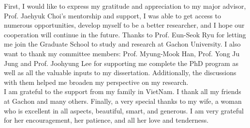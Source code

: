
\begin{acknowledgements}       
First, I would like to express my gratitude and appreciation to my major advisor, Prof. Jaehyuk Choi’s mentorship and support, I was able to get access to numerous opportunities, develop myself to be a better researcher, and I hope our cooperation will continue in the future. Thanks to Prof. Eun-Seok Ryu for letting me join the Graduate School to study and research at Gachon University. I also want to thank my committee members: Prof. Myung-Mook Han, Prof. Yong Ju Jung and Prof. Joohyung Lee for supporting me complete the PhD program as well as all the valuable inputs to my dissertation. Additionally, the discussions with them helped me broaden my perspective on my research.\\
I am grateful to the support from my family in VietNam. I thank all my friends at Gachon and many others.
Finally, a very special thanks to my wife, a woman who is excellent in
all aspects, beautiful, smart, and generous. I am very grateful for her encouragement, her patience, and all her love and tenderness.
\end{acknowledgements}
